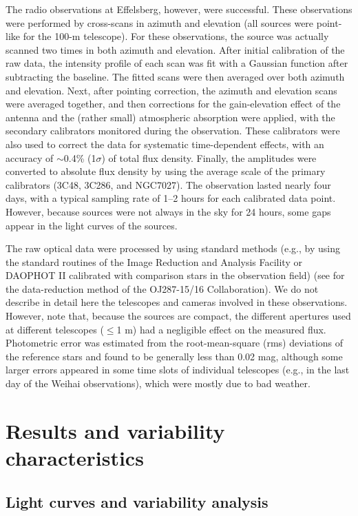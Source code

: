 \documentclass[a4paper,fleqn,usenatbib]{mnras}
\begin{document}
The radio observations at Effelsberg, however, were successful. These observations were performed by cross-scans in azimuth and elevation (all sources were point-like for the 100-m telescope). For these observations, the source was actually scanned two times in both azimuth and elevation. After initial calibration of the raw data, the
intensity profile of each scan was fit with a Gaussian
function after subtracting the baseline. The fitted scans were then
averaged over both azimuth and elevation. Next, after pointing correction, the azimuth and elevation
scans were averaged together, and then corrections for the gain-elevation effect of the antenna
and the (rather small) atmospheric absorption were applied, with the secondary calibrators monitored during
the observation. These calibrators were also used to correct
the data for systematic time-dependent effects, with an accuracy of \(\sim\)0.4\% (1\(\sigma\)) of total flux density. Finally, the
amplitudes were converted to absolute flux density by using
the average scale of the primary calibrators (3C48, 3C286, and NGC7027). The observation lasted nearly four days, with a typical sampling rate of 1--2 hours for
each calibrated data point. However, because sources were not always in the sky for 24 hours, some gaps appear in the light curves of the sources.

The raw optical data were processed by using standard methods (e.g., by using the standard routines of the Image Reduction and Analysis Facility or DAOPHOT II calibrated with comparison stars in the observation field) (see \cite{valt16} for the data-reduction method of the OJ287-15/16 Collaboration). We do not describe in detail here the telescopes and cameras involved in these observations. However, note that, because the sources are
compact, the different apertures used at different telescopes (\(\leq\)1 m) had
a negligible effect on the measured flux. Photometric error was estimated from the root-mean-square (rms) deviations of the reference stars and found to be generally less than 0.02 mag, although some larger errors appeared in some time slots of individual telescopes (e.g., in the last day of the Weihai observations), which were mostly due to bad weather.


\section[]{Results and variability characteristics}

\subsection[]{Light curves and variability analysis}
\end{document}
